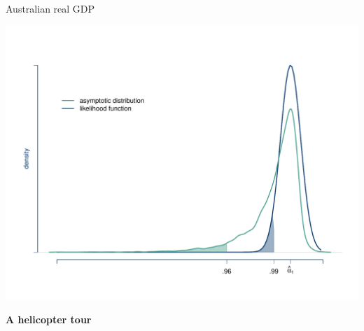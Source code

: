 \documentclass[notes,blackandwhite,mathsans]{beamer}
\begin{document}
{
\begin{frame}{Australian real GDP}

\centering
\includegraphics[scale=0.45]{grphs/05inference.pdf}

\end{frame}
}







{
\begin{frame}

\begin{adjustwidth}{-0.5cm}{0cm}
\vspace{8.3cm}\Large
\textbf{{\color{mcxs1}A helicopter} {\color{mcxs3}tour}}
\end{adjustwidth}

\end{frame}
}
\end{document}
